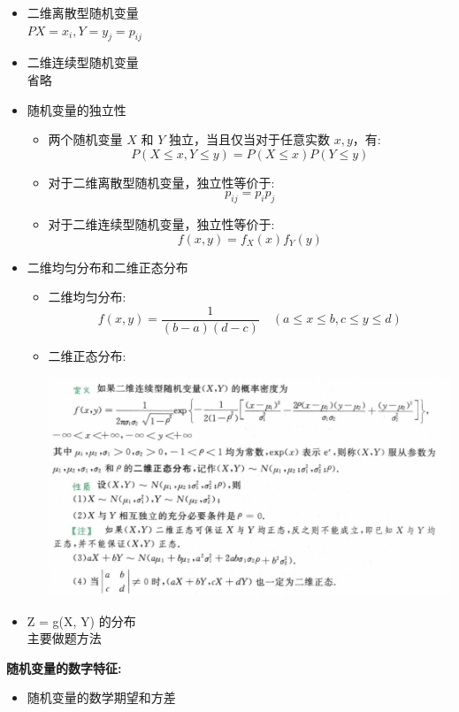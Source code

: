 \documentclass[10pt]{article}
\begin{document}
\begin{multicols}{2}
\begin{itemize}
\item 二维离散型随机变量 \\
  \( P{X = x_i, Y = y_j} = p_{ij} \)


\item 二维连续型随机变量 \\
  省略

\item 随机变量的独立性
\begin{itemize}
  \item 两个随机变量 \(X\) 和 \(Y\) 独立，当且仅当对于任意实数 \(x, y\)，有:
    \[
    P(X \leq x, Y \leq y) = P(X \leq x) P(Y \leq y)
    \]
  \item 对于二维离散型随机变量，独立性等价于:
    \[
    p_{ij} = p_i p_j
    \]
  \item 对于二维连续型随机变量，独立性等价于:
    \[
    f(x, y) = f_X(x) f_Y(y)
    \]
\end{itemize}
\item 二维均匀分布和二维正态分布
  \begin{itemize}
    \item 二维均匀分布: 
      \[
      f(x, y) = \frac{1}{(b-a)(d-c)} \quad (a \leq x \leq b, c \leq y \leq d)
      \]
    \item 二维正态分布: \\
      \begin{center}
      \includegraphics[width=1.2\linewidth]{pic/1.png}
      \end{center}
    \end{itemize}

\item Z = g(X, Y) 的分布
\\
主要做题方法

\end{itemize}

\textbf{随机变量的数字特征:}
\begin{itemize}
\item 随机变量的数学期望和方差


\end{itemize}
\end{multicols}
\end{document}
